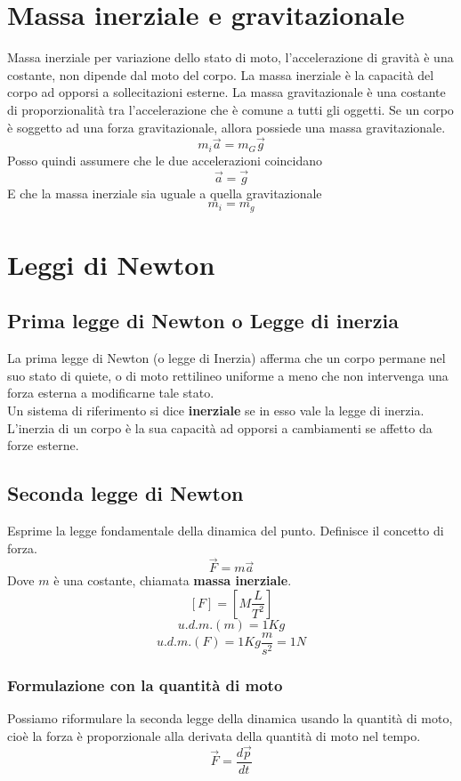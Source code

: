 \documentclass[a4paper]{report}
\begin{document}
  \section{Massa inerziale e gravitazionale}
  Massa inerziale per variazione dello stato di moto, l'accelerazione di gravità è una costante, non dipende dal moto del corpo. La massa inerziale è la capacità del corpo ad opporsi a sollecitazioni esterne. La massa gravitazionale è una costante di proporzionalità tra l'accelerazione che è comune a tutti gli oggetti. Se un corpo è soggetto ad una forza gravitazionale, allora possiede una massa gravitazionale.
  $$ m_i \vec{a} = m_G \vec{g} $$
  Posso quindi assumere che le due accelerazioni coincidano
  $$ \vec{a} = \vec{g} $$
  E che la massa inerziale sia uguale a quella gravitazionale
  $$ m_i = m_g$$

  \section{Leggi di Newton}
  \subsection{Prima legge di Newton o Legge di inerzia}
  La prima legge di Newton (o legge di Inerzia) afferma che un corpo permane nel suo stato di quiete, o di moto rettilineo uniforme a meno che non intervenga una forza esterna a modificarne tale stato.\\
  Un sistema di riferimento si dice \textbf{inerziale} se in esso vale la legge di inerzia.
  L'inerzia di un corpo è la sua capacità ad opporsi a cambiamenti se affetto da forze esterne.

  \subsection{Seconda legge di Newton}
  Esprime la legge fondamentale della dinamica del punto. Definisce il concetto di forza.
  $$ \vec{F} = m\vec{a} $$
  Dove $m$ è una costante, chiamata \textbf{massa inerziale}.
  $$ [F] = [M \frac{L}{T^2}]$$
  $$ u.d.m.(m) = 1Kg$$
  $$ u.d.m.(F) = 1 Kg \frac{m}{s^2} = 1N$$
  \subsubsection{Formulazione con la quantità di moto}
  Possiamo riformulare la seconda legge della dinamica usando la quantità di moto, cioè la forza è proporzionale alla derivata della quantità di moto nel tempo.
  $$ \vec{F} = \frac{d\vec{p}}{dt}$$
\end{document}
